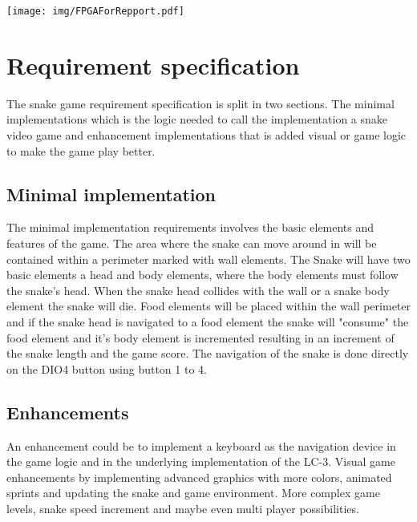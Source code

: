 \documentclass{acm_proc_article-sp}
\begin{document}
\texttt{[image: img/FPGAForRepport.pdf]} 

\section{Requirement specification}
The snake game requirement specification is split in two sections. The minimal implementations which is the logic needed to call the implementation a snake video game and enhancement implementations that is added visual or game logic to make the game play better. 

\subsection{Minimal implementation}
The minimal implementation requirements involves the basic elements and features of the game. The area where the snake can move around in will be contained within a perimeter marked with wall elements.  The Snake will have two basic elements a head and body elements, where the body elements must follow the snake's head. When the snake head collides with the wall or a snake body element the snake will die. Food elements will be placed within the wall perimeter and if the snake head is navigated to a food element the snake will "consume" the food element and it's body element is incremented resulting in an increment of the snake length and the game score. The navigation of the snake is done directly on the DIO4 button using button 1 to 4.  


\subsection{Enhancements}
An enhancement could be to implement a keyboard as the navigation device in the game logic and in the underlying implementation of the LC-3. 
Visual game enhancements by implementing advanced graphics with more colors, animated sprints and updating the snake and game environment. More complex game levels, snake speed increment and maybe even multi player possibilities. 
\end{document}
